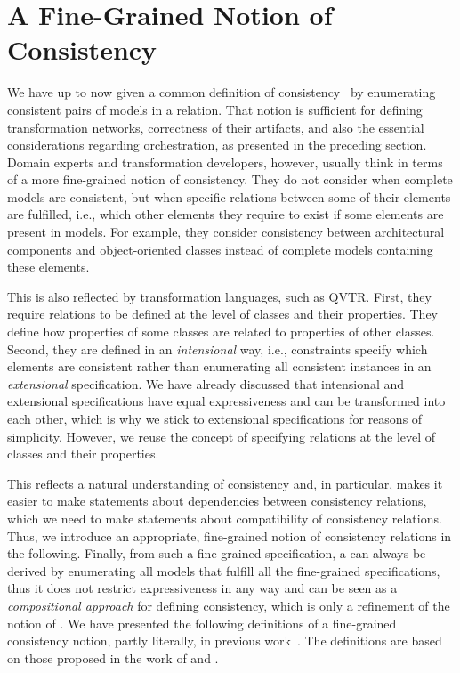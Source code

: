 \section{A Fine-Grained Notion of Consistency}
\label{chap:correctness:finegrained}

We have up to now given a common definition of consistency~\cite{stevens2010sosym} by enumerating consistent pairs of models in a relation.
That notion is sufficient for defining transformation networks, correctness of their artifacts, and also the essential considerations regarding orchestration, as presented in the preceding section.
Domain experts and transformation developers, however, usually think in terms of a more fine-grained notion of consistency.
They do not consider when complete models are consistent, but when specific relations between some of their elements are fulfilled, i.e., which other elements they require to exist if some elements are present in models.
For example, they consider consistency between architectural components and object-oriented classes instead of complete models containing these elements.

This is also reflected by transformation languages, such as \gls{QVTR}.
First, they require relations to be defined at the level of classes and their properties. They define how properties of some classes are related to properties of other classes.
Second, they are defined in an \emph{intensional} way, i.e., constraints specify which elements are consistent rather than enumerating all consistent instances in an \emph{extensional} specification.
We have already discussed that intensional and extensional specifications have equal expressiveness and can be transformed into each other, which is why we stick to extensional specifications for reasons of simplicity.
However, we reuse the concept of specifying relations at the level of classes and their properties.

This reflects a natural understanding of consistency and, in particular, makes it easier to make statements about dependencies between consistency relations, which we need to make statements about compatibility of consistency relations.
Thus, we introduce an appropriate, fine-grained notion of consistency relations in the following.
Finally, from such a fine-grained specification, a \modellevelconsistencyrelation can always be derived by enumerating all models that fulfill all the fine-grained specifications, thus it does not restrict expressiveness in any way and can be seen as a \emph{compositional approach} for defining consistency, which is only a refinement of the notion of \modellevelconsistencyrelations.
We have presented the following definitions of a fine-grained consistency notion, partly literally, in previous work~. 
The definitions are based on those proposed in the work of \textcite[Sec.~2.3.2, 4.1.1]{kramer2017a} and .


